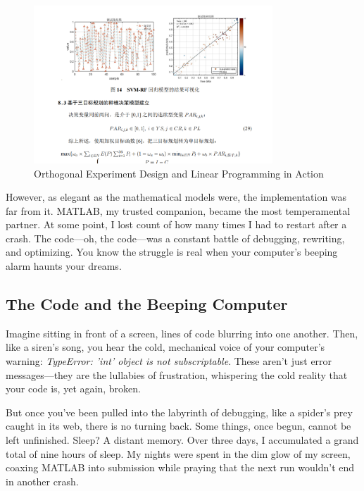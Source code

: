 \documentclass[a4paper]{article} 	%
\begin{document}
\begin{figure}[h!]
	\centering
	\includegraphics[width=0.8\textwidth]{fig002.png}  %
	\caption{Orthogonal Experiment Design and Linear Programming in Action}
	\label{fig:002}
\end{figure}

However, as elegant as the mathematical models were, the implementation was far from it. MATLAB, my trusted companion, became the most temperamental partner. At some point, I lost count of how many times I had to restart after a crash. The code—oh, the code—was a constant battle of debugging, rewriting, and optimizing. You know the struggle is real when your computer’s beeping alarm haunts your dreams. 

\subsection*{The Code and the Beeping Computer}

Imagine sitting in front of a screen, lines of code blurring into one another. Then, like a siren’s song, you hear the cold, mechanical voice of your computer's warning: \textit{TypeError: 'int' object is not subscriptable}. These aren’t just error messages—they are the lullabies of frustration, whispering the cold reality that your code is, yet again, broken.

But once you’ve been pulled into the labyrinth of debugging, like a spider's prey caught in its web, there is no turning back. Some things, once begun, cannot be left unfinished. Sleep? A distant memory. Over three days, I accumulated a grand total of nine hours of sleep. My nights were spent in the dim glow of my screen, coaxing MATLAB into submission while praying that the next run wouldn't end in another crash. 
\end{document}

